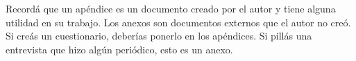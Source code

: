 Recordá que un apéndice es un documento creado por el autor y tiene alguna utilidad en su trabajo. Los anexos son documentos externos que el autor no creó. Si creás un cuestionario, deberías ponerlo en los apéndices. Si pillás una entrevista que hizo algún periódico, esto es un anexo.